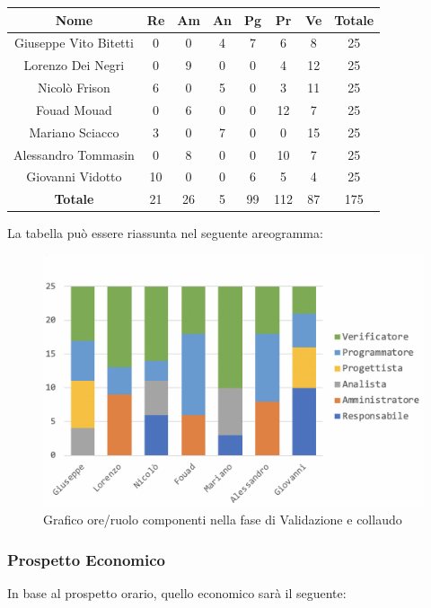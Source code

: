 		\begin{longtable}{|c|c|c|c|c|c|c|c}
			\hline
			\rowcolor{lighter-grayer}
			\textbf{Nome} & \textbf{Re} & \textbf{Am} & \textbf{An} & \textbf{Pg}  & \textbf{Pr}   & \textbf{Ve} & \textbf{Totale} \\
			\hline
			\endfirsthead
			
			\hline
			Giuseppe Vito Bitetti 		& 0 & 0 & 4 & 7 & 6 & 8 & 25\\
			\hline
			\hline
			Lorenzo Dei Negri			& 0 & 9 & 0 & 0 & 4 & 12 & 25\\
			\hline
			\hline
			Nicolò Frison				    & 6 & 0 & 5 & 0 & 3 & 11 & 25\\
			\hline
			\hline
			Fouad Mouad 				 & 0 & 6 & 0 & 0 & 12 & 7 & 25\\
			\hline
			\hline
			Mariano Sciacco 			& 3 & 0 & 7 & 0 & 0 & 15 & 25\\
			\hline
			\hline
			Alessandro Tommasin    & 0 & 8 & 0 & 0 & 10 & 7 & 25\\
			\hline
			\hline
			Giovanni Vidotto 			 & 10 & 0 & 0 & 6 & 5 & 4 & 25\\
			\hline 
			\textbf{Totale}			 & 21 &  26 & 5 & 99 & 112 & 87 & 175\\
			\hline
		\end{longtable}
		\pagebreak
		
		La tabella può essere riassunta nel seguente areogramma:
		\begin{figure}[H]
			\centering
			\includegraphics[width=0.8\linewidth]{./images/validColl1.png}
			\caption{Grafico ore/ruolo componenti nella fase di Validazione e collaudo}
			\label{fig:grafico suddivione ruoli fase Validazione e collaudo}
		\end{figure}
	
		\subsubsection{Prospetto Economico}
		In base al prospetto orario, quello economico sarà il seguente: 
		
